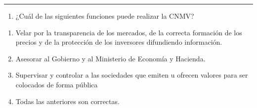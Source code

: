 \documentclass[
  letterpaper,
  DIV=11,
  numbers=noendperiod]{scrreprt}
\providecommand{\tightlist}{%
  \setlength{\itemsep}{0pt}\setlength{\parskip}{0pt}}\usepackage{longtable,booktabs,array}
\begin{document}
\begin{center}\rule{0.5\linewidth}{0.5pt}\end{center}

\begin{enumerate}
\def\labelenumi{\arabic{enumi}.}
\setcounter{enumi}{12}
\tightlist
\item
  ¿Cuál de las siguientes funciones puede realizar la CNMV?
\end{enumerate}

\begin{enumerate}
\def\labelenumi{\alph{enumi})}
\item
  Velar por la transparencia de los mercados, de la correcta formación
  de los precios y de la protección de los inversores difundiendo
  información.
\item
  Asesorar al Gobierno y al Ministerio de Economía y Hacienda.
\item
  Supervisar y controlar a las sociedades que emiten u ofrecen valores
  para ser colocados de forma pública
\item
  Todas las anteriores son correctas.
\end{enumerate}
\end{document}

